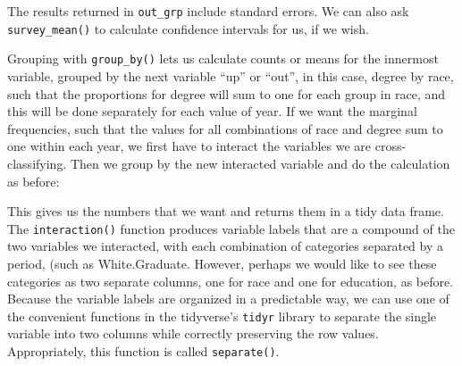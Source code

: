 \documentclass[]{book}
\newenvironment{Shaded}{\begin{snugshade}}{\end{snugshade}}
\newcommand{\CommentTok}[1]{\textcolor[rgb]{0.56,0.35,0.01}{\textit{#1}}}
\newcommand{\DataTypeTok}[1]{\textcolor[rgb]{0.13,0.29,0.53}{#1}}
\newcommand{\DecValTok}[1]{\textcolor[rgb]{0.00,0.00,0.81}{#1}}
\newcommand{\KeywordTok}[1]{\textcolor[rgb]{0.13,0.29,0.53}{\textbf{#1}}}
\newcommand{\NormalTok}[1]{#1}
\newcommand{\OperatorTok}[1]{\textcolor[rgb]{0.81,0.36,0.00}{\textbf{#1}}}
\newcommand{\OtherTok}[1]{\textcolor[rgb]{0.56,0.35,0.01}{#1}}
\newcommand{\StringTok}[1]{\textcolor[rgb]{0.31,0.60,0.02}{#1}}
\begin{document}
The results returned in \texttt{out\_grp} include standard errors. We can also ask \texttt{survey\_mean()} to calculate confidence intervals for us, if we wish.

Grouping with \texttt{group\_by()} lets us calculate counts or means for the innermost variable, grouped by the next variable ``up'' or ``out'', in this case, degree by race, such that the proportions for degree will sum to one for each group in race, and this will be done separately for each value of year. If we want the marginal frequencies, such that the values for all combinations of race and degree sum to one within each year, we first have to interact the variables we are cross-classifying. Then we group by the new interacted variable and do the calculation as before:\\

\begin{Shaded}
\end{Shaded}

This gives us the numbers that we want and returns them in a tidy data frame. The \texttt{interaction()} function produces variable labels that are a compound of the two variables we interacted, with each combination of categories separated by a period, (such as White.Graduate. However, perhaps we would like to see these categories as two separate columns, one for race and one for education, as before. Because the variable labels are organized in a predictable way, we can use one of the convenient functions in the tidyverse's \texttt{tidyr} library to separate the single variable into two columns while correctly preserving the row values. Appropriately, this function is called \texttt{separate()}.
\end{document}
